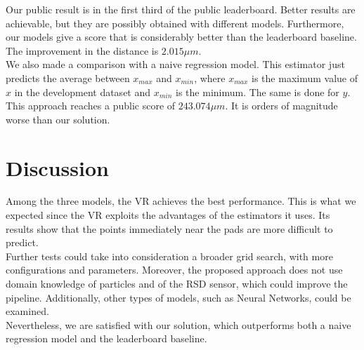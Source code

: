 \documentclass[conference]{IEEEtran}
\begin{document}
Our public result is in the first third of the public leaderboard. Better results are achievable, but they are possibly obtained with different models. Furthermore, our models give a score that is considerably better than the leaderboard baseline. The improvement in the distance is $2.015 \mu m$.\\
We also made a comparison with a naive regression model. This estimator just predicts the average between $x_{max}$ and $x_{min}$, where $x_{max}$ is the maximum value of $x$ in the development dataset and $x_{min}$ is the minimum. The same is done for $y$.
This approach reaches a public score of $243.074 \mu m$. It is orders of magnitude worse than our solution. \\



\section{Discussion}
Among the three models, the VR achieves the best performance. This is what we expected since the VR exploits the advantages of the estimators it uses. Its results show that the points immediately near the pads are more difficult to predict.\\ 

Further tests could take into consideration a broader grid search, with more configurations and parameters. Moreover, the proposed approach does not use domain knowledge of particles and of the RSD sensor, which could improve the pipeline. Additionally, other types of models, such as Neural Networks, could be examined.\\
Nevertheless, we are satisfied with our solution, which outperforms both a naive regression model and the leaderboard baseline.




\end{document}
